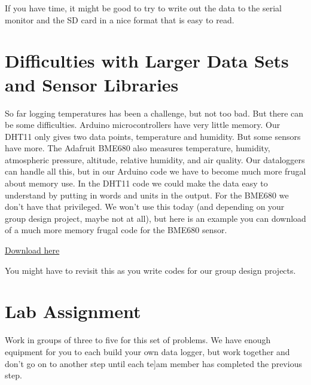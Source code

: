 If you have time, it might be good to try to write out the data to the serial monitor and the SD card in a nice format that is easy to read.

\section{Difficulties with Larger Data Sets and Sensor Libraries}
So far logging temperatures has been a challenge, but not too bad. But there can be some difficulties. Arduino microcontrollers have very little memory. Our DHT11 only gives two data points, temperature and humidity. But some sensors have more. The Adafruit BME680 also measures temperature, humidity, atmospheric pressure, altitude, relative humidity, and air quality.  Our dataloggers can handle all this, but in our Arduino code we have to become much more frugal about memory use.  In the DHT11 code we could make the data easy to understand by putting in words and units in the output.  For the BME680 we don't have that privileged.  We won't use this today (and depending on your group design project, maybe not at all), but here is an example you can download of a much more memory frugal code for the BME680 sensor.

\begin{center}
\href{https://raw.githubusercontent.com/rtlines/IntermediateLabPH250/main/Code/DataLogBME680_lines.ino}{Download here}
\end{center}

\noindent You might have to revisit this as you write codes for our group design projects.


\section{Lab Assignment}
	
	Work in groups of three to five for this set of problems. We have enough equipment for you to each build your own data logger, but work together and don't go on to another step until each te]am member has completed the previous step.
	

